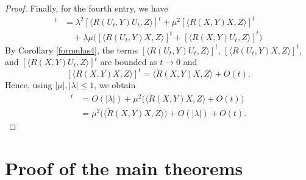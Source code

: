 \documentclass[11pt]{article}
\numberwithin{equation}{section}
\numberwithin{equation}{section}
\begin{document}
\begin{proof}
	Finally, for the fourth entry, we have
	\begin{align*}
		[\langle R(\Psi,Y)\Psi,Z\rangle ]^t&{}= \lambda^2[\langle R(U_t,Y)U_t,Z\rangle]^t+\mu^2 [\langle R(X,Y)X,Z\rangle]^t\\
		&\quad{}+ \lambda\mu\bigl([\langle R(U_t,Y)X,Z\rangle]^t + [\langle R(X,Y)U_t,Z\rangle]^t \bigr)
	\end{align*}		
	By Corollary \ref{formulas4}, the terms $[\langle R(U_t,Y)U_t,Z\rangle]^t$, $[\langle R(U_t,Y)X,Z\rangle]^t$, and $[\langle R(X,Y)U_t,Z\rangle]^t$ are bounded as $t\to 0$ and
	\[ [\langle R(X,Y)X,Z\rangle]^t=\bigl\langle\check{R}(X,Y)X,Z\bigr\rangle+O(t). \]
	Hence, using $|\mu|,|\lambda|\leq 1$, we obtain
	\begin{align*}
		[\langle R(\Psi,Y)\Psi,Z\rangle ]^t&{}= O(|\lambda|)+\mu^2\bigl(\bigl\langle \check{R}(X,Y)X,Z\bigr\rangle+O(t) \bigr)\\
		&{}= \mu^2\bigl(\bigl\langle \check{R}(X,Y)X,Z\bigr\rangle\bigr)+O(|\lambda|)+O(t).
 \tag*{\qed}
 \end{align*}
 \renewcommand{\qed}{}
\end{proof}



\section{Proof of the main theorems}\label{proofs}
\end{document}
